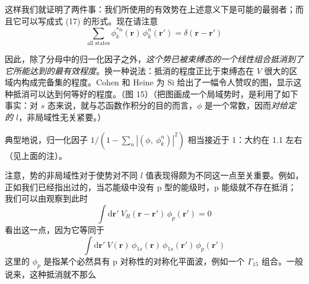 这样我们就证明了两件事：我们所使用的有效势在上述意义下是可能的最弱者；而且它可以写成式 (17) 的形式。现在请注意
\begin{equation*}
\sum_{\text{all states}}\phi_k^{*n}(\mathbf{r})\,\phi_k^n(\mathbf{r}')=\delta(\mathbf{r}-\mathbf{r}')\tag{18}
\end{equation*}

因此，除了分母中的归一化因子之外，\emph{这个势已被束缚态的一个线性组合抵消到了它所能达到的最有效程度}。换一种说法：抵消的程度正比于束缚态在 $V$ 很大的区域内构成完备集的程度。Cohen 和 Heine 为 Si 给出了一幅令人赞叹的图，显示这种抵消可以达到何等好的程度。（图 15）（把图画成一个局域势时，是利用了如下事实：对 $s$ 态来说，就与芯函数作积分的目的而言，$\phi$ 是一个常数，因而\emph{对给定的 $l$}，非局域性无关紧要。）


典型地说，归一化因子 $1\big/\left(1-\sum_n\left|\left(\phi,\ \phi_k^n\right)\right|^2\right)$ 相当接近于 1：大约在 1.1 左右（见上面的注）。

注意，势的非局域性对于使势对不同 $l$ 值表现得颇为不同这一点至关重要。例如，正如我们已经指出过的，当芯能级中没有 p 型的能级时，p 能级就不存在抵消；我们可以由观察到此时
\begin{equation*}
\int \mathrm{d}\mathbf{r}'\ V_R(\mathbf{r}-\mathbf{r}')\,\phi_p(\mathbf{r}')=0
\end{equation*}
看出这一点，因为它等同于
\begin{equation*}
\int \mathrm{d}\mathbf{r}'\ V(\mathbf{r})\,\phi_{1s}(\mathbf{r})\,\phi_{1s}(\mathbf{r}')\,\phi_p(\mathbf{r}')
\end{equation*}
这里的 $\phi_p$ 是指某个必然具有 p 对称性的对称化平面波，例如一个 $\Gamma_{15}$ 组合。一般说来，这种抵消就不那么

